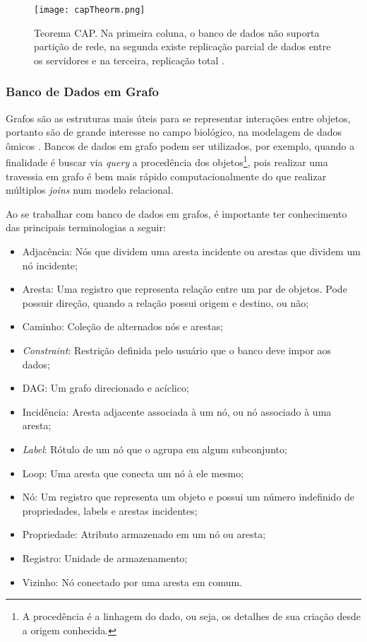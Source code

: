 \begin{figure}[h]
    \centering
    \texttt{[image: capTheorm.png]}
    \caption{Teorema CAP. Na primeira coluna, o banco de dados não suporta partição de rede, na segunda existe replicação parcial de dados entre os servidores e na terceira, replicação total \cite{CAPTheorem}.}
    \label{fig:capTheorm}
\end{figure} 

\subsubsection{Banco de Dados em Grafo}

\indent Grafos são as estruturas mais úteis para se representar interações entre objetos, portanto são de grande interesse no campo biológico, na modelagem de dados ômicos \cite{vicknair10}. Bancos de dados em grafo podem ser utilizados, por exemplo, quando a finalidade é buscar via \textit{query} a procedência dos objetos\footnote{A procedência é a linhagem do dado, ou seja, os detalhes de sua criação desde a origem conhecida.}, pois realizar uma travessia em grafo é bem mais rápido computacionalmente do que realizar múltiplos \textit{joins} num modelo relacional.

\indent Ao se trabalhar com banco de dados em grafos, é importante ter conhecimento das principais terminologias a seguir:
\begin{itemize}
\item Adjacência: Nós que dividem uma aresta incidente ou arestas que dividem um nó incidente;
\item Aresta: Uma registro que representa relação entre um par de objetos. Pode possuir direção, quando a relação possui origem e destino, ou não;
\item Caminho: Coleção de alternados nós e arestas;
\item \textit{Constraint}: Restrição definida pelo usuário que o banco deve impor aos dados;
\item DAG: Um grafo direcionado e acíclico;
\item Incidência: Aresta adjacente associada à um nó, ou nó associado à uma aresta;
\item \textit{Label}: Rótulo de um nó que o agrupa em algum subconjunto; 
\item Loop: Uma aresta que conecta um nó à ele mesmo;
\item Nó: Um registro que representa um objeto e possui um número indefinido de propriedades, labels e arestas incidentes;
\item Propriedade: Atributo armazenado em um nó ou aresta;
\item Registro: Unidade de armazenamento;
\item Vizinho: Nó conectado por uma aresta em comum.
\end{itemize}


